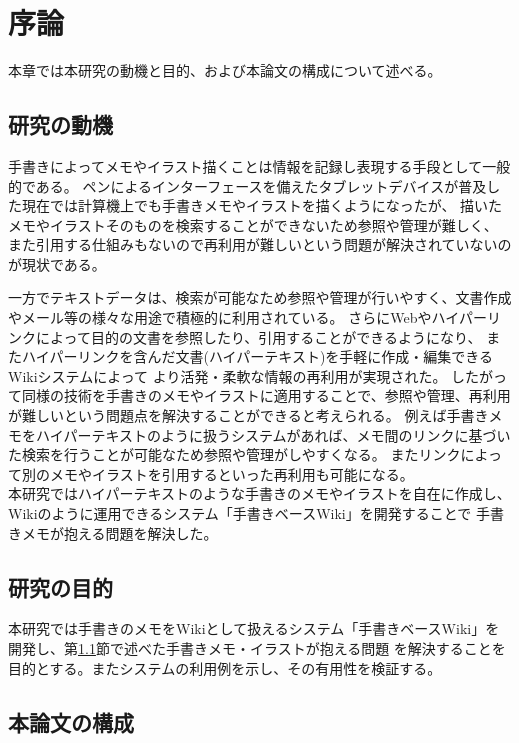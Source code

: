 \chapter{序論}
\label{chap:introduction}

本章では本研究の動機と目的、および本論文の構成について述べる。

\newpage

\section{研究の動機}
\label{douki}

手書きによってメモやイラスト描くことは情報を記録し表現する手段として一般的である。
ペンによるインターフェースを備えたタブレットデバイスが普及した現在では計算機上でも手書きメモやイラストを描くようになったが、
描いたメモやイラストそのものを検索することができないため参照や管理が難しく、
また引用する仕組みもないので再利用が難しいという問題が解決されていないのが現状である。

一方でテキストデータは、検索が可能なため参照や管理が行いやすく、文書作成やメール等の様々な用途で積極的に利用されている。
さらにWebやハイパーリンクによって目的の文書を参照したり、引用することができるようになり、
またハイパーリンクを含んだ文書(ハイパーテキスト)を手軽に作成・編集できるWikiシステムによって
より活発・柔軟な情報の再利用が実現された。
したがって同様の技術を手書きのメモやイラストに適用することで、参照や管理、再利用が難しいという問題点を解決することができると考えられる。
例えば手書きメモをハイパーテキストのように扱うシステムがあれば、メモ間のリンクに基づいた検索を行うことが可能なため参照や管理がしやすくなる。
またリンクによって別のメモやイラストを引用するといった再利用も可能になる。
\\
本研究ではハイパーテキストのような手書きのメモやイラストを自在に作成し、Wikiのように運用できるシステム「手書きベースWiki」を開発することで
手書きメモが抱える問題を解決した。

\section{研究の目的}
本研究では手書きのメモをWikiとして扱えるシステム「手書きベースWiki」を開発し、第\ref{douki}節で述べた手書きメモ・イラストが抱える問題
を解決することを目的とする。またシステムの利用例を示し、その有用性を検証する。

\newpage

\section{本論文の構成}


